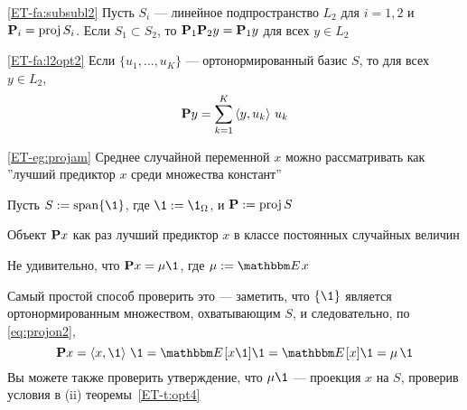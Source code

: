 \begin{frame}

    \vspace{2em}
    \Fact\eqref{ET-fa:subsubl2}
    Пусть $S_i$ --- линейное подпространство $L_2$ для $i=1,2$ и $\mathbf P_i =
    \operatorname{proj} S_i$. Если $S_1 \subset S_2$, то
        $\mathbf P_1 \mathbf P_2 y = \mathbf P_1 y$ для всех $y \in L_2$
        
    \vspace{1em}
    \Fact\eqref{ET-fa:l2opt2}
    Если $\{u_1, \ldots, u_K\}$ --- ортонормированный базис $S$, то для всех $y
    \in L_2$,
    \begin{equation}
        \label{eq:projon2}
        \mathbf P y = \sum_{k=1}^K \left\langle{y, u_k}\right\rangle \, u_k
    \end{equation}
    
\end{frame}

\begin{frame}

    \vspace{2em}
    \Eg
    \eqref{ET-eg:projam}
    Среднее случайной переменной $x$ можно рассматривать как 
    ''лучший предиктор $x$ среди множества констант''  
    
    Пусть $S := \Span\{\1\}$, где $\1 := \1_\Omega$,
    и $\mathbf P := \operatorname{proj} S$
    
    Объект $\mathbf P x$ как раз лучший предиктор
    $x$ в классе постоянных случайных величин
    
   Не удивительно, что $\boldP x = \mu \1$, где $\mu := \EE x$
    
    Самый простой способ проверить это --- заметить, что $\{\1\}$ является
    ортонормированным множеством, охватывающим $S$, и следовательно, по \eqref{eq:projon2},
    \begin{equation*}
        \boldP x 
        = \inner{x, \1} \, \1
        = \EE[x \1] \1 = \EE[x] \1 = \mu \, \1
    \end{equation*}
    Вы можете также проверить утверждение, что $\mu \1$ --- проекция $x$ на
    $S$, проверив условия в (ii) теоремы~\ref{ET-t:opt4}
    

\end{frame}

